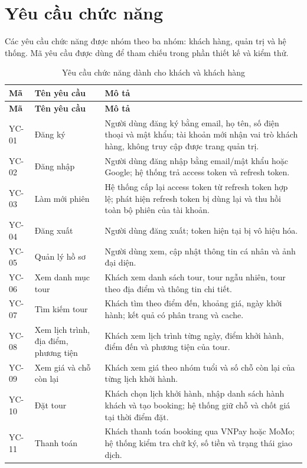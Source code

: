 \section{Yêu cầu chức năng}
\label{sec:yeu-cau-chuc-nang}

Các yêu cầu chức năng được nhóm theo ba nhóm: khách hàng, quản trị và hệ thống. Mã yêu cầu được dùng để tham chiếu trong phần thiết kế và kiểm thử.

\begin{longtable}{@{}C{1.35cm}L{4.0cm}L{9.5cm}@{}}
\caption{Yêu cầu chức năng dành cho khách và khách hàng}
\label{tab:yc-khach}\\
\toprule
\textbf{Mã} & \textbf{Tên yêu cầu} & \textbf{Mô tả}\\
\midrule
\endfirsthead
\toprule
\textbf{Mã} & \textbf{Tên yêu cầu} & \textbf{Mô tả}\\
\midrule
\endhead
\bottomrule
\endfoot
YC-01 & Đăng ký & Người dùng đăng ký bằng email, họ tên, số điện thoại và mật khẩu; tài khoản mới nhận vai trò khách hàng, không truy cập được trang quản trị.\\
YC-02 & Đăng nhập & Người dùng đăng nhập bằng email/mật khẩu hoặc Google; hệ thống trả access token và refresh token.\\
YC-03 & Làm mới phiên & Hệ thống cấp lại access token từ refresh token hợp lệ; phát hiện refresh token bị dùng lại và thu hồi toàn bộ phiên của tài khoản.\\
YC-04 & Đăng xuất & Người dùng đăng xuất; token hiện tại bị vô hiệu hóa.\\
YC-05 & Quản lý hồ sơ & Người dùng xem, cập nhật thông tin cá nhân và ảnh đại diện.\\
YC-06 & Xem danh mục tour & Khách xem danh sách tour, tour ngẫu nhiên, tour theo địa điểm và thông tin chi tiết.\\
YC-07 & Tìm kiếm tour & Khách tìm theo điểm đến, khoảng giá, ngày khởi hành; kết quả có phân trang và cache.\\
YC-08 & Xem lịch trình, địa điểm, phương tiện & Khách xem lịch trình từng ngày, điểm khởi hành, điểm đến và phương tiện của tour.\\
YC-09 & Xem giá và chỗ còn lại & Khách xem giá theo nhóm tuổi và số chỗ còn lại của từng lịch khởi hành.\\
YC-10 & Đặt tour & Khách chọn lịch khởi hành, nhập danh sách hành khách và tạo booking; hệ thống giữ chỗ và chốt giá tại thời điểm đặt.\\
YC-11 & Thanh toán & Khách thanh toán booking qua VNPay hoặc MoMo; hệ thống kiểm tra chữ ký, số tiền và trạng thái giao dịch.\\

\end{longtable}
